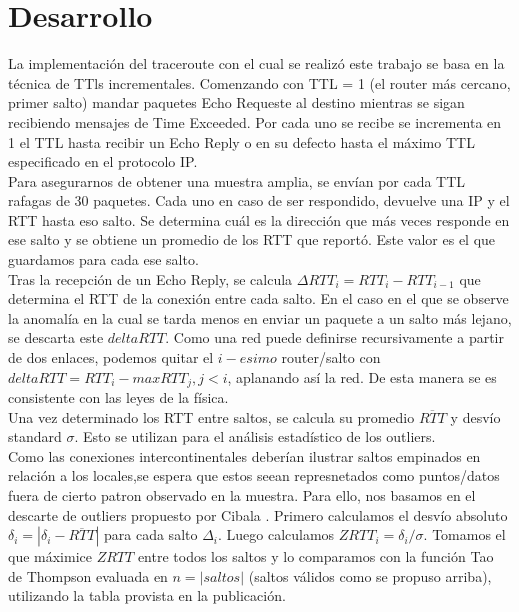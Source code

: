 \section{Desarrollo}

La implementación del traceroute con el cual se realizó este trabajo se basa en la técnica de TTls incrementales. Comenzando con TTL = 1 (el router más cercano, primer salto) mandar paquetes Echo Requeste al destino mientras se sigan recibiendo mensajes de Time Exceeded. Por cada uno se recibe se incrementa en 1 el TTL hasta recibir un Echo Reply o en su defecto hasta el máximo TTL especificado en el protocolo IP. \\
Para asegurarnos de obtener una muestra amplia, se envían por cada TTL rafagas de 30 paquetes. Cada uno en caso de ser respondido, devuelve una IP y el RTT hasta eso salto. Se determina cuál es la dirección que más veces responde en ese salto y se obtiene un promedio de los RTT que reportó. Este valor es el que guardamos para cada ese salto.\\

Tras la recepción de un Echo Reply, se calcula 
$\Delta RTT_{i}=RTT_{i}-RTT_{i-1}$ que determina el RTT de 
la conexión entre cada salto. En el caso en el que se 
observe la anomalía en la cual se tarda menos en enviar un 
paquete a un salto más lejano, se descarta este 
$deltaRTT$. Como una red puede definirse recursivamente a 
partir de dos enlaces, podemos quitar el $i-esimo$ 
router/salto con $deltaRTT = RTT_{i}-max{RTT_{j}}, j < i$, 
aplanando así la red. De esta manera se es consistente con 
las leyes de la física.\\

Una vez determinado los RTT entre saltos, se calcula su promedio $\overline{RTT}$ y desvío standard $\sigma$. Esto se utilizan para el análisis estadístico de los outliers.\\

Como las conexiones intercontinentales deberían ilustrar saltos empinados en relación a los locales,se espera que estos seean represnetados como puntos/datos fuera de cierto patron observado en la muestra.
Para ello, nos basamos en el descarte de outliers propuesto por Cibala \cite{Cimbala}. 
Primero calculamos el desvío absoluto $\delta_{i}=|\delta_{i}-\overline{RTT}|$ para cada salto   $\Delta_{i}$.
Luego calculamos $ZRTT_{i}=\delta_{i}/\sigma$. Tomamos el que máximice $ZRTT$ entre todos los saltos y lo comparamos con la función Tao de Thompson evaluada en $n = |saltos|$ (saltos válidos como se propuso arriba), utilizando la tabla provista en la publicación.\\

